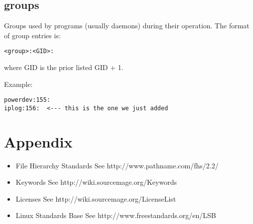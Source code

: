 \documentclass[a4paper,10pt]{book}
\begin{document}
\section{groups}
Groups used by programs (usually daemons) during their operation. The format
of group entries is:
\begin{verbatim}
<group>:<GID>:
\end{verbatim}
where GID is the prior listed GID + 1.

Example:
\begin{verbatim}
powerdev:155:
iplog:156:  <--- this is the one we just added
\end{verbatim}

\chapter{Appendix}
\begin{itemize}
\item File Hierarchy Standards
	See http://www.pathname.com/fhs/2.2/
\item Keywords
	See http://wiki.sourcemage.org/Keywords
\item Licenses
	See http://wiki.sourcemage.org/LicenseList
\item Linux Standards Base
	See http://www.freestandards.org/en/LSB
\end{itemize}
\end{document}
